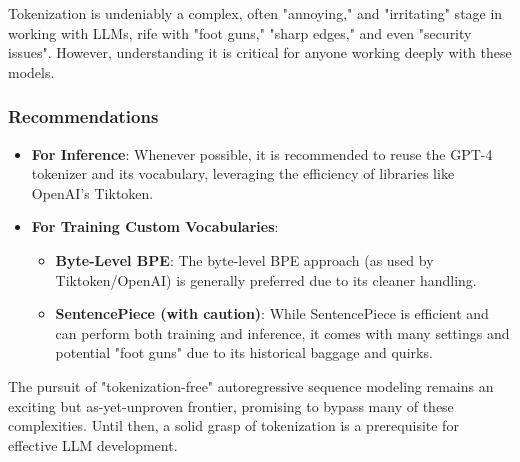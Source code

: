 Tokenization is undeniably a complex, often "annoying," and "irritating" stage in working with LLMs, rife with "foot guns," "sharp edges," and even "security issues". However, understanding it is critical for anyone working deeply with these models.

\subsubsection{Recommendations}
\begin{itemize}
    \item \textbf{For Inference}: Whenever possible, it is recommended to reuse the GPT-4 tokenizer and its vocabulary, leveraging the efficiency of libraries like OpenAI's Tiktoken.
    \item \textbf{For Training Custom Vocabularies}:
    \begin{itemize}
        \item \textbf{Byte-Level BPE}: The byte-level BPE approach (as used by Tiktoken/OpenAI) is generally preferred due to its cleaner handling.
        \item \textbf{SentencePiece (with caution)}: While SentencePiece is efficient and can perform both training and inference, it comes with many settings and potential "foot guns" due to its historical baggage and quirks.
    \end{itemize}
\end{itemize}

The pursuit of "tokenization-free" autoregressive sequence modeling remains an exciting but as-yet-unproven frontier, promising to bypass many of these complexities. Until then, a solid grasp of tokenization is a prerequisite for effective LLM development.

